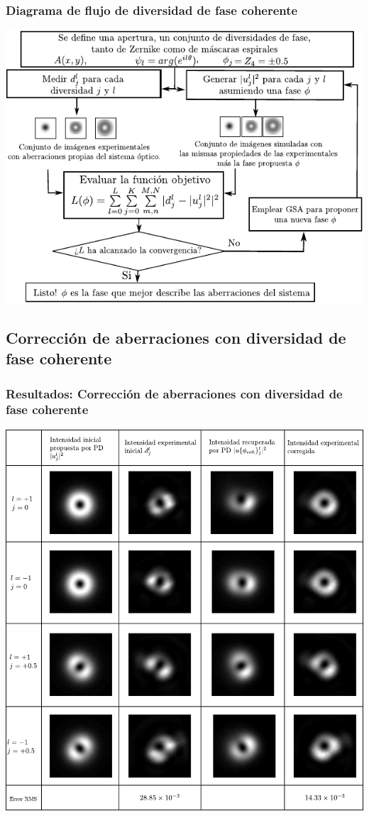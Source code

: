 \documentclass[serif,8pt]{beamer}
\begin{document}
		\begin{frame}
		\frametitle{Diagrama de flujo de diversidad de fase coherente}
		\centering
			\includegraphics[scale=1]{img/PDflux.pdf}
		\end{frame}

	\subsection{Corrección de aberraciones con diversidad de fase coherente}
		\begin{frame}
		\frametitle{Resultados: Corrección de aberraciones con diversidad de fase coherente}
		\begin{center}
		\includegraphics[scale=0.4]{img/CorPD0.pdf}
		\end{center}

		\end{frame}
\end{document}
